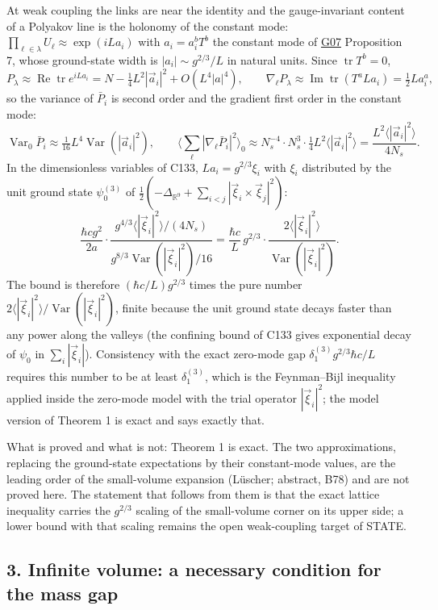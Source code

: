 \documentclass[11pt,a4paper]{article}
\begin{document}
At weak coupling the links are near the identity and the gauge-invariant
content of a Polyakov line is the holonomy of the constant mode:
\(\prod_{\ell\in\lambda}U_\ell\approx\exp(iLa_i)\) with \(a_i=a_i^bT^b\)
the constant mode of \href{low-dimensional-mass-gap.md}{G07} Proposition
7, whose ground-state width is \(|a_i|\sim g^{2/3}/L\) in natural units.
Since \(\operatorname{tr}T^b=0\),
\[P_\lambda\approx\operatorname{Re}\operatorname{tr}e^{iLa_i}=N-\tfrac14L^2|\vec a_i|^2+O(L^4|a|^4),\qquad
\nabla_\ell P_\lambda\approx\operatorname{Im}\operatorname{tr}(T^aLa_i)=\tfrac12La_i^a ,\]
so the variance of \(\bar P_i\) is second order and the gradient first
order in the constant mode:
\[\operatorname{Var}_0\bar P_i\approx\tfrac1{16}L^4\operatorname{Var}(|\vec a_i|^2),\qquad
\Big\langle\sum_\ell|\nabla_\ell\bar P_i|^2\Big\rangle_0\approx N_s^{-4}\cdot N_s^3\cdot\tfrac14L^2\langle|\vec a_i|^2\rangle
=\frac{L^2\langle|\vec a_i|^2\rangle}{4N_s}.\] In the dimensionless
variables of C133, \(La_i=g^{2/3}\xi_i\) with \(\xi_i\) distributed by
the unit ground state \(\psi_0^{(3)}\) of
\(\tfrac12(-\Delta_{\mathbb R^9}+\sum_{i<j}|\vec\xi_i\times\vec\xi_j|^2)\):
\[\frac{\hbar cg^2}{2a}\cdot\frac{g^{4/3}\langle|\vec\xi_i|^2\rangle/(4N_s)}{g^{8/3}\operatorname{Var}(|\vec\xi_i|^2)/16}
=\frac{\hbar c}{L}\,g^{2/3}\cdot\frac{2\langle|\vec\xi_i|^2\rangle}{\operatorname{Var}(|\vec\xi_i|^2)} .\]
The bound is therefore \((\hbar c/L)g^{2/3}\) times the pure number
\(2\langle|\vec\xi_i|^2\rangle/\operatorname{Var}(|\vec\xi_i|^2)\),
finite because the unit ground state decays faster than any power along
the valleys (the confining bound of C133 gives exponential decay of
\(\psi_0\) in \(\sum_i|\vec\xi_i|\)). Consistency with the exact
zero-mode gap \(\delta_1^{(3)}g^{2/3}\hbar c/L\) requires this number to
be at least \(\delta_1^{(3)}\), which is the Feynman--Bijl inequality
applied inside the zero-mode model with the trial operator
\(|\vec\xi_i|^2\); the model version of Theorem 1 is exact and says
exactly that.

What is proved and what is not: Theorem 1 is exact. The two
approximations, replacing the ground-state expectations by their
constant-mode values, are the leading order of the small-volume
expansion (Lüscher; abstract, B78) and are not proved here. The
statement that follows from them is that the exact lattice inequality
carries the \(g^{2/3}\) scaling of the small-volume corner on its upper
side; a lower bound with that scaling remains the open weak-coupling
target of STATE.

\hypertarget{infinite-volume-a-necessary-condition-for-the-mass-gap}{%
\subsection{3. Infinite volume: a necessary condition for the mass
gap}\label{infinite-volume-a-necessary-condition-for-the-mass-gap}}
\end{document}
